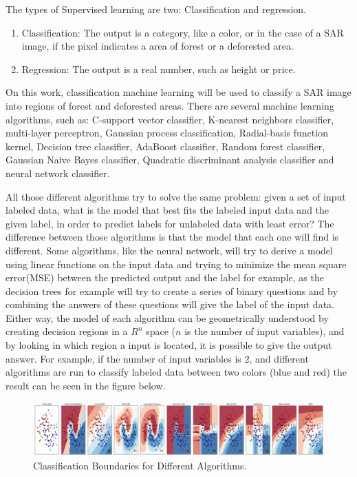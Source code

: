 The types of Supervised learning are two: Classification and regression.
\begin{enumerate}
    \item Classification: The output is a category, like a color, or in the case of a SAR image, if the pixel indicates a area of forest or a deforested area.
    \item Regression: The output is a real number, such as height or price.
\end{enumerate}{}

On this work, classification machine learning will be used to classify a SAR image into regions of forest and deforested areas. \newline
There are several machine learning algorithms, such as: C-support vector classifier, K-nearest neighbors classifier, multi-layer perceptron, Gaussian process classification, Radial-basis function kernel, Decision tree classifier, AdaBoost classifier, Random forest classifier, Gaussian Naive Bayes classifier, Quadratic discriminant analysis classifier and neural network classifier.\newline

All those different algorithms try to solve the same problem: given a set of input labeled data, what is the model that best fits the labeled input data and the given label, in order to predict labels for unlabeled data with least error?\newline
The difference between those algorithms is that the model that each one will find is different. Some algorithms, like the neural network, will try to derive a model using linear functions on the input data and trying to minimize the mean square error(MSE) between the predicted output and the label for example, as the decision trees for example will try to create a series of binary questions and by combining the answers of these questions will give the label of the input data.
\newline
Either way, the model of each algorithm can be geometrically understood by creating decision regions in a $R^n$ space ($n$ is the number of input variables), and by looking in which region a input is located, it is possible to give the output answer.
\newline
For example, if the number of input variables is 2, and different algorithms are run to classify labeled data between two colors (blue and red) the result can be seen in the figure below.

\begin{figure}[H]
    \centering
    \includegraphics[width=\linewidth]{Chapter3/regions.pdf}
    \caption{Classification Boundaries for Different Algorithms.}
    \label{fig:machine_learning_classification}
\end{figure}{}

